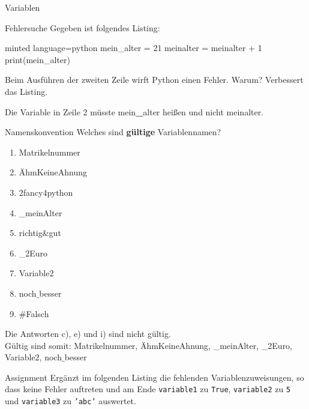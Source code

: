 \begin{task}[points=auto]{Variablen }
    \begin{subtask*}[points=0]{Fehlersuche}
        Gegeben ist folgendes Listing:
        \begin{codeBlock}[]{minted language=python}
            mein_alter = 21
            meinalter = meinalter + 1
            print(mein_alter)
        \end{codeBlock}
        Beim Ausführen der zweiten Zeile wirft Python einen Fehler. Warum? Verbessert das Listing.
        \begin{solution}
            Die Variable in Zeile 2 müsste mein\textbf{\_}alter heißen und nicht meinalter.
        \end{solution}
    \end{subtask*}
    \begin{subtask*}[points=0]{Namenskonvention}
        Welches sind \textbf{gültige} Variablennamen?
        \begin{multicols}{3}
            \begin{enumerate}
                \item Matrikelnummer
                \item ÄhmKeineAhnung
                \item 2fancy4python
                \item {\_}meinAlter
                \item richtig\&gut
                \item {\_}2Euro
                \item Variable2
                \item noch$\_$besser
                \item \#Falsch
            \end{enumerate}
        \end{multicols}
        \begin{solution}
            Die Antworten c), e) und i) sind nicht gültig.\\Gültig sind somit: Matrikelnummer, ÄhmKeineAhnung, {\_}meinAlter, {\_}2Euro, Variable2, noch$\_$besser
        \end{solution}
    \end{subtask*}
    \begin{subtask*}[points=0]{Assignment}
        Ergänzt im folgenden Listing die fehlenden Variablenzuweisungen, so dass keine Fehler auftreten und am Ende \texttt{variable1} zu \texttt{True}, \texttt{variable2} zu \texttt{5} und \texttt{variable3} zu \texttt{'abc'} auswertet.

\end{subtask*}
\end{task}

